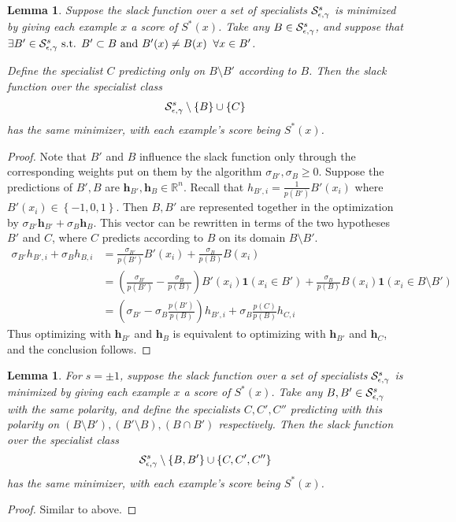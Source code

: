 \documentclass{article}
\newtheorem{lemma}[theorem]{Lemma}
\newcommand{\x}{\vec{x}}
\newcommand{\RR}{\mathbb{R}}      %
\newcommand{\ifn}{\mathbf{1}} %
\newcommand{\lrp}[1]{\left(#1\right)}
\newcommand{\lrsetb}[1]{\left\{#1\right\}}
\newcommand{\vh}{\mathbf{h}}
\begin{document}
\begin{lemma}
\label{lem:replacespec}
Suppose the slack function over a set of specialists ${\cal S}_{\epsilon,\gamma}^{s}$ is minimized by giving each example $x$ a score of $S^* (x)$. 
Take any $B \in {\cal S}_{\epsilon,\gamma}^{s}$, and suppose that $\exists B' \in {\cal S}_{\epsilon,\gamma}^{s} \mbox{ s.t. } B' \subset B \mbox{ and } B' (x) \neq B (x) \;\;\forall x \in B'$. 

Define the specialist $C$ predicting only on $B \setminus B'$ according to $B$. 
Then the slack function over the specialist class 
$$ \SepsGam^{s} \setminus \lrsetb{B} \cup \lrsetb{C} $$
has the same minimizer, with each example's score being $S^* (x)$. 
\end{lemma}
\begin{proof}
Note that $B'$ and $B$ influence the slack function only through the corresponding weights put on them by the algorithm $\sigma_{B'}, \sigma_{B} \geq 0$. 
Suppose the predictions of $B', B$ are $\vh_{B'}, \vh_{B} \in \RR^{n}$. 
Recall that $h_{B', i} = \frac{1}{p (B')} B' (x_i)$ where $B' (x_i) \in \lrsetb{-1, 0, 1}$. 
Then $B, B'$ are represented together in the optimization by $\sigma_{B'} \vh_{B'} + \sigma_{B} \vh_{B}$. 
This vector can be rewritten in terms of the two hypotheses $B'$ and $C$, where $C$ predicts according to $B$ on its domain $B \setminus B'$. 
\begin{align*}
\sigma_{B'} h_{B', i} + \sigma_{B} h_{B, i} 
&= \frac{\sigma_{B'}}{p (B')} B' (x_i) + \frac{\sigma_{B}}{p (B)} B (x_i) \\ 
&= \lrp{ \frac{\sigma_{B'}}{p (B')} - \frac{\sigma_{B}}{p (B)} } B' (x_i) \ifn(x_i \in B') + \frac{\sigma_{B}}{p (B)} B (x_i) \ifn(x_i \in B \setminus B') \\ 
&= \lrp{ \sigma_{B'} - \sigma_{B} \frac{p (B')}{p (B)} } h_{B', i} + \sigma_{B} \frac{p (C)}{p (B)} h_{C, i} 
\end{align*}
Thus optimizing with $\vh_{B'}$ and $\vh_{B}$ is equivalent to optimizing with $\vh_{B'}$ and $\vh_{C}$, and the conclusion follows.
\end{proof}

\begin{lemma}
\label{lem:replacesamesign}
For $s = \pm 1$, suppose the slack function over a set of specialists ${\cal S}_{\epsilon,\gamma}^{s}$ is minimized by giving each example $x$ a score of $S^* (x)$. 
Take any $B, B' \in {\cal S}_{\epsilon,\gamma}^{s}$ with the same polarity, 
and define the specialists $C, C', C''$ predicting with this polarity on $(B \setminus B'), (B' \setminus B), (B \cap B')$ respectively. 
Then the slack function over the specialist class 
$$ \SepsGam^{s} \setminus \lrsetb{B, B'} \cup \lrsetb{C, C', C''} $$
has the same minimizer, with each example's score being $S^* (x)$. 
\end{lemma}
\begin{proof}
Similar to above.
\end{proof}
\end{document}
